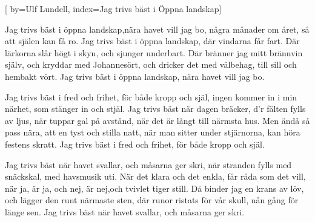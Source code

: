 


[ 	%
	by={Ulf Lundell},
	index={Jag trivs bäst i Öppna landskap}]		%
	
\beginverse*		%
Jag trivs bäst i öppna landskap,nära havet vill jag bo,
några månader om året, så att själen kan få ro.
Jag trivs bäst i öppna landskap, där vindarna får fart.
Där lärkorna slår högt i skyn, och sjunger underbart.
Där bränner jag mitt brännvin själv, och kryddar med Johannesört,
och dricker det med välbehag, till sill och hembakt vört.
Jag trivs bäst i öppna landskap, nära havet vill jag bo.
\endverse			%

\beginverse*		%
Jag trivs bäst i fred och frihet, för både kropp och själ,
ingen kommer in i min närhet, som stänger in och stjäl.
Jag trivs bäst när dagen bräcker, d'r fälten fylls av ljus,
när tuppar gal på avstånd, när det är långt till närmsta hus.
Men ändå så pass nära, att en tyst och stilla natt,
när man sitter under stjärnorna, kan höra festens skratt.
Jag trivs bäst i fred och frihet, för både kropp och själ.
\endverse			%

\beginverse*		%
Jag trivs bäst när havet svallar, och måsarna ger skri,
när stranden fylls med snäckskal, med havsmusik uti.
När det klara och det enkla, får råda som det vill,
när ja, är ja, och nej, är nej,och tvivlet tiger still.
Då binder jag en krans av löv, och lägger den runt närmaste sten,
där runor ristats för vår skull, nån gång för länge sen.
Jag trivs bäst när havet svallar, och måsarna ger skri.
\endverse			%
\endsong			%
